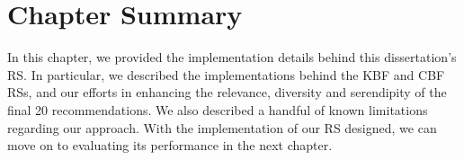 \section{Chapter Summary}

In this chapter, we provided the implementation details behind this dissertation's RS.
In particular, we described the implementations behind the KBF and CBF RSs,
and our efforts in enhancing the relevance, diversity and serendipity of the final 20 recommendations.
We also described a handful of known limitations regarding our approach.
With the implementation of our RS designed, we can move on to evaluating its performance in the next chapter.
